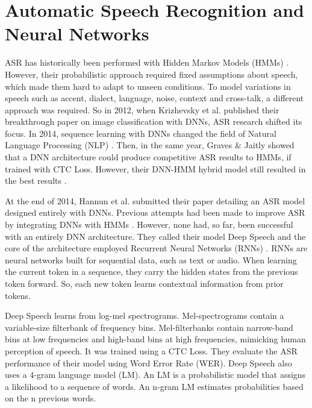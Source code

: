\section{Automatic Speech Recognition and Neural Networks}\label{lr_sec:asr_early_dnns}
ASR has historically been performed with Hidden Markov Models (HMMs) \cite{galeshmm2008, Juang01081991}. However, their probabilistic approach required fixed assumptions about speech, which made them hard to adapt to unseen conditions. To model variations in speech such as accent, dialect, language, noise, context and cross-talk, a different approach was required. So in 2012, when Krizhevsky et al. \cite{krizhevsky2012imagenet} published their breakthrough paper on image classification with DNNs, ASR research shifted its focus. In 2014, sequence learning with DNNs changed the field of Natural Language Processing (NLP) \cite{sutskever2014sequence}. Then, in the same year, Graves \& Jaitly showed that a DNN architecture could produce competitive ASR results to HMMs, if trained with CTC Loss. However, their DNN-HMM hybrid model still resulted in the best results \cite{pmlr-v32-graves14}.

At the end of 2014, Hannun et al. \cite{hannun2014deep} submitted their paper detailing an ASR model designed entirely with DNNs. Previous attempts had been made to improve ASR by integrating DNNs with HMMs \cite{hintondnnhmm, Hamidcnnhmm}. However, none had, so far, been successful with an entirely DNN architecture. They called their model Deep Speech and the core of the architecture employed Recurrent Neural Networks (RNNs) \cite{Graves2012}. RNNs are neural networks built for sequential data, such as text or audio. When learning the current token in a sequence, they carry the hidden states from the previous token forward. So, each new token learns contextual information from prior tokens.

Deep Speech learns from log-mel spectrograms. Mel-spectrograms contain a variable-size filterbank of frequency bins. Mel-filterbanks contain narrow-band bins at low frequencies and high-band bins at high frequencies, mimicking human perception of speech. It was trained using a CTC Loss. They evaluate the ASR performance of their model using Word Error Rate (WER). Deep Speech also uses a 4-gram language model (LM). An LM is a probabilistic model that assigns a likelihood to a sequence of words. An n-gram LM estimates probabilities based on the n previous words.


